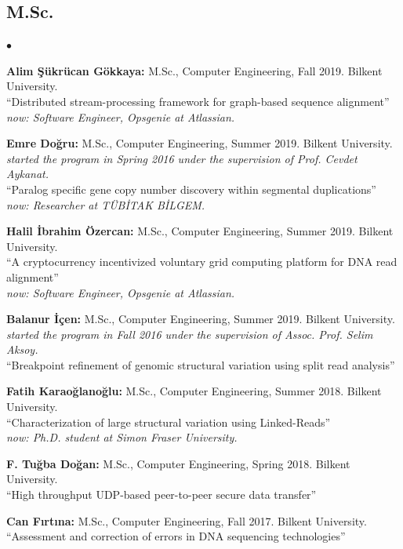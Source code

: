 \documentclass[margin,line]{res}
\newenvironment{list2}{
  \begin{list}{$\bullet$}{%
      \setlength{\itemsep}{0.1cm}
      \setlength{\parsep}{0in} \setlength{\parskip}{0in}
      \setlength{\topsep}{0in} \setlength{\partopsep}{0in} 
      \setlength{\leftmargin}{0.2in}}}{\end{list}}
\begin{document}
\begin{resume}
\subsection{\small \sc M.Sc.}
\begin{list2}
\item
  {\bf Alim Şükrücan Gökkaya:} M.Sc., Computer Engineering, Fall 2019.
  Bilkent University. \\
  ``Distributed stream-processing framework for graph-based sequence alignment''\\
  {\it now: Software Engineer, Opsgenie at Atlassian.}
\item
  {\bf Emre Doğru:} M.Sc., Computer Engineering, Summer 2019.
  Bilkent University. {\it started the program in Spring 2016 under the supervision of Prof. Cevdet Aykanat.}\\
  ``Paralog specific gene copy number discovery within segmental duplications''\\
  {\it now: Researcher at TÜBİTAK BİLGEM.}
\item
  {\bf Halil İbrahim Özercan:} M.Sc., Computer Engineering, Summer 2019.
  Bilkent University. \\
  ``A cryptocurrency incentivized voluntary grid computing platform for DNA read alignment''\\
  {\it now: Software Engineer, Opsgenie at Atlassian.}
\item
  {\bf Balanur İçen:} M.Sc., Computer Engineering, Summer 2019.
  Bilkent University. {\it started the program in Fall 2016 under the supervision of Assoc. Prof. Selim Aksoy.}\\
  ``Breakpoint refinement of genomic structural variation using split read analysis''
\item
  {\bf Fatih Karaoğlanoğlu:} M.Sc., Computer Engineering, Summer 2018.
  Bilkent University. \\
  ``Characterization of large structural variation using Linked-Reads''\\
  {\it now: Ph.D. student at Simon Fraser University.}
\item
  {\bf F. Tuğba Doğan:} M.Sc., Computer Engineering, Spring 2018.
  Bilkent University. \\
  ``High throughput UDP-based peer-to-peer secure data transfer''
\item
  {\bf Can Fırtına:} M.Sc., Computer Engineering,  Fall 2017.
  Bilkent University. \\
  ``Assessment and correction of errors in DNA sequencing technologies''\\

\end{list2}
\end{resume}
\end{document}
